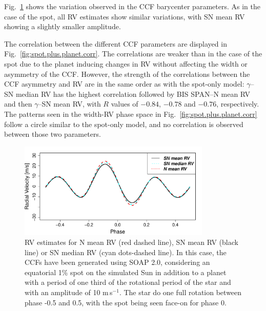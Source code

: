 \documentclass{aa}
\def\ms{\hbox{\,m\,s$^{-1}$}}         %
\begin{document}
Fig.~\ref{fig:spot.plus.planet} shows the variation observed in the CCF barycenter parameters. As in the case of the spot, all RV estimates show similar variations, with SN mean RV showing a slightly smaller amplitude.

The correlation between the different CCF parameters are displayed in Fig.~\ref{fig:spot.plus.planet.corr}. 
The correlations are weaker than in the case of the spot due to the planet inducing changes in RV without affecting the width or asymmetry of the CCF.  However, the strength of the correlations between the CCF asymmetry and RV are in the same order as with the spot-only model: $\gamma$--SN median RV has the highest correlation followed by BIS SPAN--N mean RV and then $\gamma$--SN mean RV, with $R$ values of $-0.84$, $-0.78$ and $-0.76$, respectively. 
The patterns seen in the width-RV phase space in Fig.~\ref{fig:spot.plus.planet.corr} follow a circle similar to the spot-only model, and no correlation is observed between those two parameters.

\begin{figure}[htbp]
\begin{center}
\includegraphics[width = 3.6in]{RV_comparison_SPOT_PLANET.pdf} 
 \caption{RV estimates for N mean RV (red dashed line),  SN mean RV (black line) or SN median RV (cyan dots-dashed line). In this case, the CCFs have been generated using SOAP 2.0, considering an equatorial 1\% spot on the simulated Sun in addition to a planet with a period of one third of the rotational period of the star and with an amplitude of 10\,\ms. The star do one full rotation between phase -0.5 and 0.5, with the spot being seen face-on for phase 0.}
    \label{fig:spot.plus.planet}
\end{center}
\end{figure}
\end{document}
